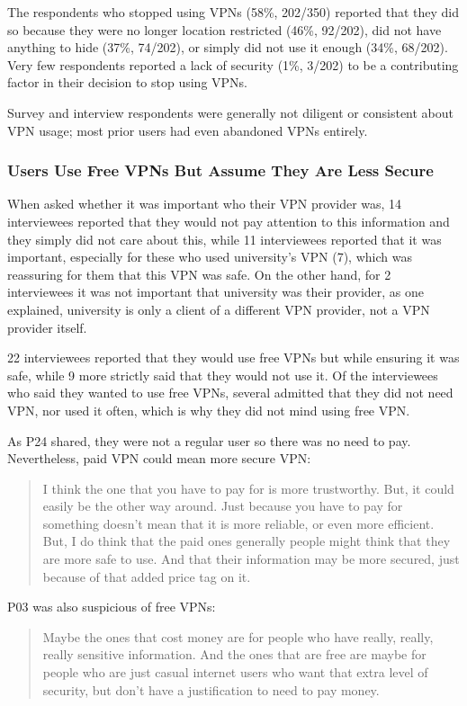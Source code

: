 The respondents who stopped using VPNs (58\%, 202/350) reported that they did
so because they were no longer location restricted (46\%, 92/202), did not
have anything to hide (37\%, 74/202), or simply did not use it enough (34\%,
68/202). Very few respondents reported a lack of security (1\%, 3/202) to be a
contributing factor in their decision to stop using VPNs.

Survey and interview respondents were generally not diligent or consistent about VPN usage; most prior users had even abandoned VPNs entirely.

\subsubsection{Users Use Free VPNs But Assume They Are Less Secure}

When asked whether it was important who their
VPN provider was, 14 interviewees reported that they would not pay attention
to this information and they simply did not care about this, while 11
interviewees reported that it was important, especially for these who used
university’s VPN (7), which was reassuring for them that this VPN was safe. On
the other hand, for 2 interviewees it was not important that university was
their provider, as one explained, university is only a client of a different
VPN provider, not a VPN provider itself. 

 22 interviewees reported that they would use free VPNs but while ensuring it was safe,
while 9 more strictly said that they would not use it. Of the interviewees who said they wanted to use free VPNs, several admitted that they did not need VPN, nor used it often, which
is why they did not mind using free VPN. 

As P24 shared, they were not a regular user so there was no need to pay.
Nevertheless, paid VPN could mean more secure VPN: \begin{quote} I think the
one that you have to pay for is more trustworthy. But, it could easily be the
other way around. Just because you have to pay for something doesn't mean that
it is more reliable, or even more efficient. But, I do think that the paid
ones generally people might think that they are more safe to use. And that
their information may be more secured, just because of that added price tag on
it.\end{quote}

P03 was also suspicious of free VPNs: \begin{quote}Maybe the ones that cost money are for people who have
really, really, really sensitive information. And the ones that are free are
maybe for people who are just casual internet users who want that extra level
of security, but don't have a justification to need to pay money. \end{quote}

